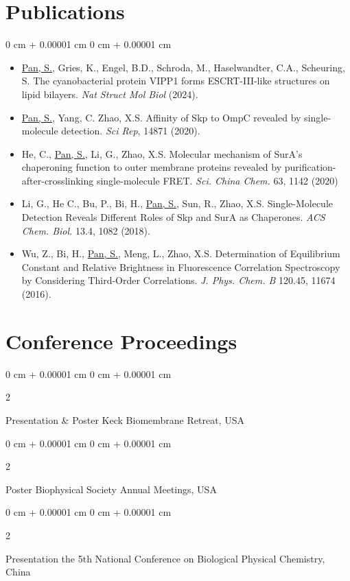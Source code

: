 \documentclass[10pt, letterpaper]{article}
\newenvironment{highlightsforbulletentries}{
        \begin{itemize}[
                topsep=0.10 cm,
                parsep=0.10 cm,
                partopsep=0pt,
                itemsep=0pt,
                leftmargin=10pt
                ]
        }{
\end{itemize}
} %
\newenvironment{onecolentry}{
        \begin{adjustwidth}{
                        0 cm + 0.00001 cm
                }{
                        0 cm + 0.00001 cm
                }
        }{
        \end{adjustwidth}
} %
\newenvironment{twocolentry}[2][]{
        \onecolentry
        \def\secondColumn{#2}
        \setcolumnwidth{\fill, 4.5 cm}
        \begin{paracol}{2}
        }{
                \switchcolumn \raggedleft \secondColumn
        \end{paracol}
        \endonecolentry
} %
\begin{document}
\section{Publications}
\begin{samepage}
        \begin{onecolentry}
                \begin{highlightsforbulletentries}
                \item \underline{Pan, S.}, Gries, K., Engel, B.D., Schroda, M., Haselwandter, C.A., Scheuring, S. The cyanobacterial protein VIPP1 forms ESCRT-III-like structures on lipid bilayers. \textit{Nat Struct Mol Biol} (2024).
                \item \underline{Pan, S.}, Yang, C. Zhao, X.S. Affinity of Skp to OmpC revealed by single-molecule detection. \textit{Sci Rep}, 14871 (2020).
                \item He, C., \underline{Pan, S.}, Li, G., Zhao, X.S. Molecular mechanism of SurA’s chaperoning function to outer membrane proteins revealed by purification-after-crosslinking single-molecule FRET. \textit{Sci. China Chem.} 63, 1142 (2020)
                \item Li, G., He C., Bu, P., Bi, H., \underline{Pan, S.}, Sun, R., Zhao, X.S. Single-Molecule Detection Reveals Different Roles of Skp and SurA as Chaperones. \textit{ACS Chem. Biol.} 13.4, 1082 (2018).
                \item Wu, Z., Bi, H., \underline{Pan, S.}, Meng, L., Zhao, X.S. Determination of Equilibrium Constant and Relative Brightness in Fluorescence Correlation Spectroscopy by Considering Third-Order Correlations. \textit{J. Phys. Chem. B} 120.45, 11674 (2016).
                \end{highlightsforbulletentries}
        \end{onecolentry}
\end{samepage}

\section{Conference Proceedings}
\begin{twocolentry}{2024}
        Presentation \& Poster \hfill Keck Biomembrane Retreat, USA\end{twocolentry}
\begin{twocolentry}{2024}
        Poster \hfill Biophysical Society Annual Meetings, USA\end{twocolentry}
\begin{twocolentry}{2018}
        Presentation \hfill the 5th National Conference on Biological Physical Chemistry, China\end{twocolentry}
\end{document}
